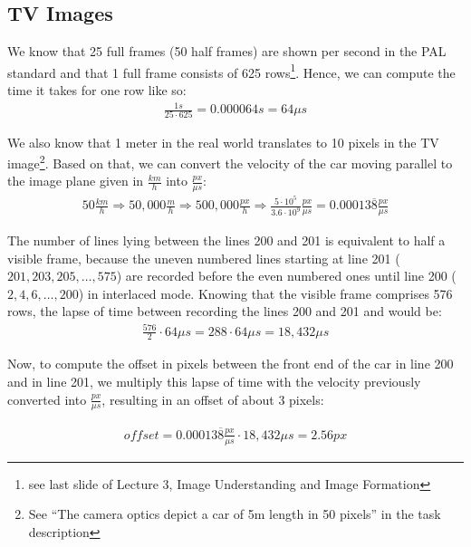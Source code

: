 \documentclass[a4paper,12pt]{article}
\begin{document}
		
	\subsection{TV Images}
	We know that 25 full frames (50 half frames) are shown per second in the PAL standard and that 1 full frame consists of 625 rows\footnote{see last slide of Lecture 3, Image Understanding and Image Formation}. Hence, we can compute the time it takes for one row like so:
	\begin{align*}
		\frac{1 s}{25 \cdot 625} = 0.000064 s = 64\mu s
	\end{align*}
	
	We also know that 1 meter in the real world translates to 10 pixels in the TV image\footnote{See ``The camera optics depict a car of 5m length in 50 pixels'' in the task description}. Based on that, we can convert the velocity of the car moving parallel to the image plane given in $\frac{km}{h}$ into $\frac{px}{\mu s}$:
	\begin{align*}
		50 \frac{km}{h} \Rightarrow 50,000 \frac{m}{h} \Rightarrow 500,000 \frac{px}{h} \Rightarrow \frac{5 \cdot 10^{5}}{3.6 \cdot 10^{9}} \frac{px}{\mu s} = 0.00013\overline{8} \frac{px}{\mu s}
	\end{align*}
	
	The number of lines lying between the lines 200 and 201 is equivalent to half a visible frame, because the uneven numbered lines starting at line 201 ($201, 203, 205, \dots, 575$) are recorded before the even numbered ones until line 200 ($2, 4, 6, \dots, 200$) in interlaced mode. Knowing that the visible frame comprises 576 rows, the lapse of time between recording the lines 200 and 201 and would be:
	\begin{align*}
	\frac{576}{2} \cdot 64\mu s = 288 \cdot 64\mu s = 18,432 \mu s
	\end{align*}
	
	Now, to compute the offset in pixels between the front end of the car in line 200 and in line 201, we multiply this lapse of time with the velocity previously converted into $\frac{px}{\mu s}$, resulting in an offset of about 3 pixels:
	
	\begin{align*}
	\mathit{offset} = 0.00013\overline{8} \frac{px}{\mu s} \cdot 18,432 \mu s = 2.56 px
	\end{align*}	
\end{document}
